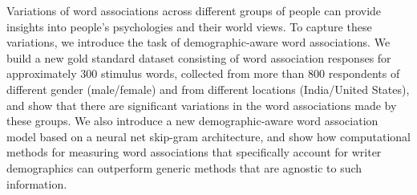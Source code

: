 Variations of word associations across different groups of people can provide insights into people's psychologies and their world views. To capture these variations, we introduce the task of demographic-aware word associations. We build a new gold standard dataset consisting of word association responses for approximately 300 stimulus words, collected from more than 800 respondents of different gender (male/female) and from different locations (India/United States), and show that there are significant variations in the word associations made by these groups. We also introduce a new demographic-aware word association model based on a neural net skip-gram architecture, and show how computational methods for measuring word associations that specifically account for writer demographics can outperform generic methods that are agnostic to such information.
